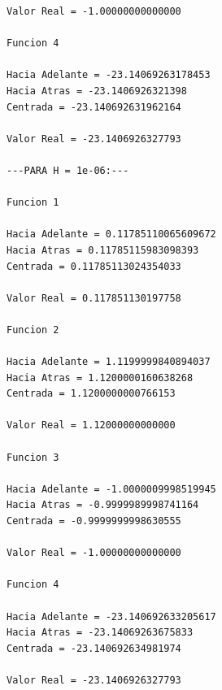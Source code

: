 \documentclass[12pt]{article}
\begin{document}
\begin{lstlisting}
Valor Real = -1.00000000000000

Funcion 4

Hacia Adelante = -23.14069263178453
Hacia Atras = -23.1406926321398
Centrada = -23.140692631962164

Valor Real = -23.1406926327793

---PARA H = 1e-06:---

Funcion 1

Hacia Adelante = 0.11785110065609672
Hacia Atras = 0.11785115983098393
Centrada = 0.11785113024354033

Valor Real = 0.117851130197758

Funcion 2

Hacia Adelante = 1.1199999840894037
Hacia Atras = 1.1200000160638268
Centrada = 1.1200000000766153

Valor Real = 1.12000000000000

Funcion 3

Hacia Adelante = -1.0000009998519945
Hacia Atras = -0.9999989998741164
Centrada = -0.9999999998630555

Valor Real = -1.00000000000000

Funcion 4

Hacia Adelante = -23.140692633205617
Hacia Atras = -23.14069263675833
Centrada = -23.140692634981974

Valor Real = -23.1406926327793
\end{lstlisting}
\end{document}
